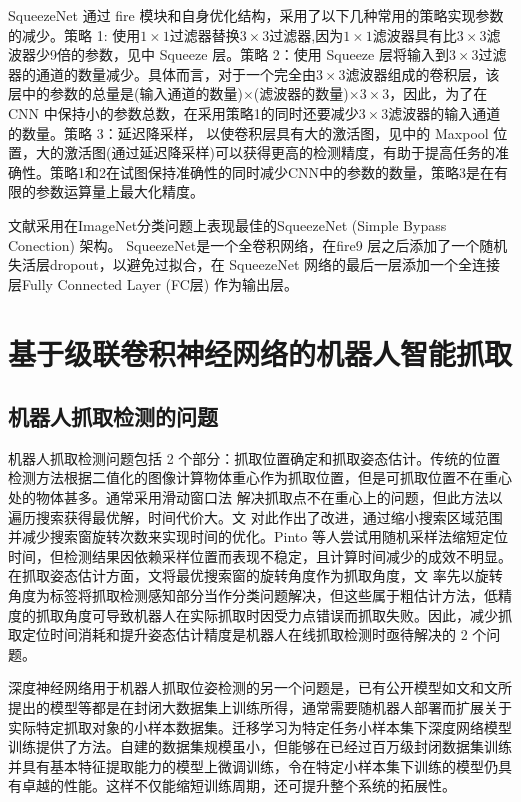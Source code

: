 SqueezeNet 通过 f\/ire 模块和自身优化结构，采用了以下几种常用的策略实现参数的减少。策略 1: 使用$1\times1$过滤器替换$3\times3$过滤器,因为$1\times1$滤波器具有比$3\times3$滤波器少9倍的参数，见中 Squeeze 层。策略 2：使用 Squeeze 层将输入到$3\times3$过滤器的通道的数量减少。具体而言，对于一个完全由$3\times3$滤波器组成的卷积层，该层中的参数的总量是(输入通道的数量)$\times$(滤波器的数量)$\times3\times3$，因此，为了在 CNN 中保持小的参数总数，在采用策略1的同时还要减少$3\times3$滤波器的输入通道的数量。策略 3：延迟降采样， 以使卷积层具有大的激活图，见中的 Maxpool 位置，大的激活图(通过延迟降采样)可以获得更高的检测精度，有助于提高任务的准确性。策略1和2在试图保持准确性的同时减少CNN中的参数的数量，策略3是在有限的参数运算量上最大化精度。 

文献\cite{bib:one}采用在ImageNet分类问题上表现最佳的SqueezeNet (Simple Bypass  Conection) 架构。 SqueezeNet是一个全卷积网络，在f\/ire9 层之后添加了一个随机失活层dropout，以避免过拟合，在 SqueezeNet 网络的最后一层添加一个全连接层Fully Connected Layer (FC层) 作为输出层。

\section{基于级联卷积神经网络的机器人智能抓取}

\subsection{机器人抓取检测的问题}

机器人抓取检测问题包括 2 个部分：抓取位置确定和抓取姿态估计。传统的位置检测方法根据二值化的图像计算物体重心作为抓取位置，但是可抓取位置不在重心处的物体甚多。通常采用滑动窗口法 解决抓取点不在重心上的问题，但此方法以遍历搜索获得最优解，时间代价大。文\cite{bibb8} 对此作出了改进，通过缩小搜索区域范围并减少搜索窗旋转次数来实现时间的优化。Pinto 等人尝试用随机采样法缩短定位时间，但检测结果因依赖采样位置而表现不稳定，且计算时间减少的成效不明显。 在抓取姿态估计方面，文\cite{bibb7,bibb10}将最优搜索窗的旋转角度作为抓取角度，文\cite{bibb9} 率先以旋转角度为标签将抓取检测感知部分当作分类问题解决，但这些属于粗估计方法，低精度的抓取角度可导致机器人在实际抓取时因受力点错误而抓取失败。因此，减少抓取定位时间消耗和提升姿态估计精度是机器人在线抓取检测时亟待解决的 2 个问题。

深度神经网络用于机器人抓取位姿检测的另一个问题是，已有公开模型如文\cite{bibb7}和文\cite{bibb11}所提出的模型等都是在封闭大数据集上训练所得，通常需要随机器人部署而扩展关于实际特定抓取对象的小样本数据集。迁移学习为特定任务小样本集下深度网络模型训练提供了方法。自建的数据集规模虽小，但能够在已经过百万级封闭数据集训练并具有基本特征提取能力的模型上微调训练，令在特定小样本集下训练的模型仍具有卓越的性能。这样不仅能缩短训练周期，还可提升整个系统的拓展性。

